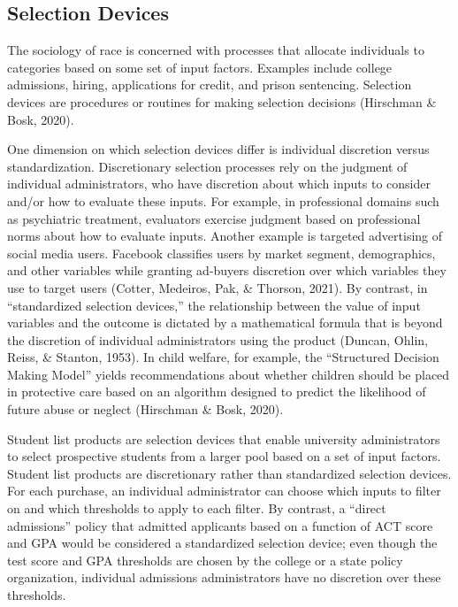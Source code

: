 \documentclass[
  12pt,
]{article}
\begin{document}
\hypertarget{selection-devices}{%
\subsection{Selection Devices}\label{selection-devices}}

The sociology of race is concerned with processes that allocate individuals to categories based on some set of input factors. Examples include college admissions, hiring, applications for credit, and prison sentencing. Selection devices are procedures or routines for making selection decisions (Hirschman \& Bosk, 2020).

One dimension on which selection devices differ is individual discretion versus standardization. Discretionary selection processes rely on the judgment of individual administrators, who have discretion about which inputs to consider and/or how to evaluate these inputs. For example, in professional domains such as psychiatric treatment, evaluators exercise judgment based on professional norms about how to evaluate inputs. Another example is targeted advertising of social media users. Facebook classifies users by market segment, demographics, and other variables while granting ad-buyers discretion over which variables they use to target users (Cotter, Medeiros, Pak, \& Thorson, 2021). By contrast, in ``standardized selection devices,'' the relationship between the value of input variables and the outcome is dictated by a mathematical formula that is beyond the discretion of individual administrators using the product (Duncan, Ohlin, Reiss, \& Stanton, 1953). In child welfare, for example, the ``Structured Decision Making Model'' yields recommendations about whether children should be placed in protective care based on an algorithm designed to predict the likelihood of future abuse or neglect (Hirschman \& Bosk, 2020).

Student list products are selection devices that enable university administrators to select prospective students from a larger pool based on a set of input factors. Student list products are discretionary rather than standardized selection devices. For each purchase, an individual administrator can choose which inputs to filter on and which thresholds to apply to each filter. By contrast, a ``direct admissions'' policy that admitted applicants based on a function of ACT score and GPA would be considered a standardized selection device; even though the test score and GPA thresholds are chosen by the college or a state policy organization, individual admissions administrators have no discretion over these thresholds.
\end{document}
